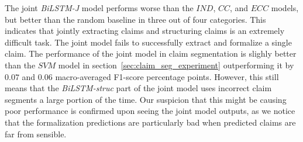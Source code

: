 
The joint \textit{BiLSTM-J} model performs worse than the $IND$, $CC$, and $ECC$
models, but better than the random baseline in three out of four categories.
This indicates that jointly extracting claims and structuring claims is an
extremely difficult task. The joint model fails to successfully extract and
formalize a single claim. 
The performance of the joint model in claim segmentation is slighly better than the 
$SVM$ model in section~\ref{sec:claim_seg_experiment} outperforming it by 
$0.07$ and $0.06$ macro-averaged F1-score percentage points. However, this still means
that the \textit{BiLSTM-struc} part of the joint model uses incorrect claim segments
a large portion of the time. 
Our suspicion that this might be causing poor performance is confirmed upon
seeing the joint model outputs, as we notice that the formalization predictions
are particularly bad when predicted claims are far from sensible. 

